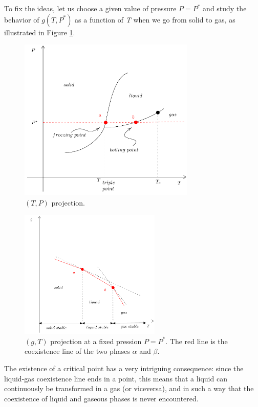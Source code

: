 \documentclass[../main/main.tex]{subfiles}
\begin{document}
To fix the ideas, let us choose a given value of pressure \( P = P^* \) and study the behavior of \( g(T,P^*) \) as a function of \emph{T} when we go from solid to gas, as illustrated in Figure \ref{fig:2_2}.

\begin{figure}[h!]
\centering
\includegraphics[width=0.75\textwidth]{../lessons/2_image/2.pdf}
\caption{\label{fig:2_2} \( (T,P) \) projection.}
\end{figure}



\begin{figure}[h!]
\centering
\includegraphics[width=0.6\textwidth]{../lessons/2_image/3.pdf}
\caption{\label{fig:2_3}  \( (g,T) \) projection at a fixed pression \( P = P^* \). The red line is the coexistence line of the two phases \( \alpha\) and \( \beta\).}
\end{figure}

The existence of a critical point has a very intriguing consequence: since the liquid-gas coexistence line ends in a point, this means that a liquid can continuously be transformed in a gas
(or viceversa), and in such a way that the coexistence of liquid and gaseous phases is never encountered.
\end{document}

